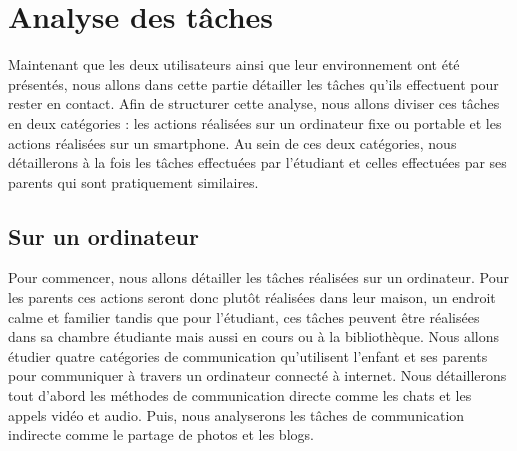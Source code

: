 \documentclass[12pt]{article}
\begin{document}
\section{Analyse des tâches}
Maintenant que les deux utilisateurs ainsi que leur environnement ont été présentés, nous allons dans cette partie détailler les tâches qu'ils effectuent pour rester en contact. Afin de structurer cette analyse, nous allons diviser ces tâches en deux catégories : les actions réalisées sur un ordinateur fixe ou portable et les actions réalisées sur un smartphone. Au sein de ces deux catégories, nous détaillerons à la fois les tâches effectuées par l'étudiant et celles effectuées par ses parents qui sont pratiquement similaires.

\subsection{Sur un ordinateur}
Pour commencer, nous allons détailler les tâches réalisées sur un ordinateur. Pour les parents ces actions seront donc plutôt réalisées dans leur maison, un endroit calme et familier tandis que pour l'étudiant, ces tâches peuvent être réalisées dans sa chambre étudiante mais aussi en cours ou à la bibliothèque. Nous allons étudier quatre catégories de communication qu'utilisent l'enfant et ses parents pour communiquer à travers un ordinateur connecté à internet. Nous détaillerons tout d'abord les méthodes de communication directe comme les chats et les appels vidéo et audio. Puis, nous analyserons les tâches de communication indirecte comme le partage de photos et les blogs.~\\
\end{document}
